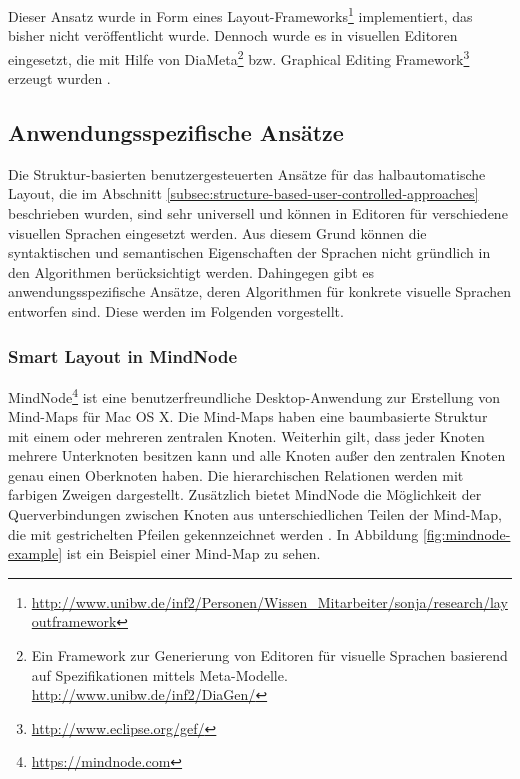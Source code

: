 



Dieser Ansatz wurde in Form eines Layout-Frameworks\footnote{\url{http://www.unibw.de/inf2/Personen/Wissen_Mitarbeiter/sonja/research/layoutframework}} implementiert, das bisher nicht veröffentlicht wurde. Dennoch wurde es in visuellen Editoren eingesetzt, die mit Hilfe von DiaMeta\footnote{Ein Framework zur Generierung von Editoren für visuelle Sprachen basierend auf Spezifikationen mittels Meta-Modelle. \url{http://www.unibw.de/inf2/DiaGen/}} bzw. Graphical Editing Framework\footnote{\url{http://www.eclipse.org/gef/}} erzeugt wurden \cite{Maier12A-Pattern-based}.

\subsection{Anwendungsspezifische Ansätze}

Die Struktur-basierten benutzergesteuerten Ansätze für das halbautomatische Layout, die im Abschnitt \ref{subsec:structure-based-user-controlled-approaches} beschrieben wurden, sind sehr universell und können in Editoren für verschiedene visuellen Sprachen eingesetzt werden. Aus diesem Grund können die syntaktischen und semantischen Eigenschaften der Sprachen nicht gründlich in den Algorithmen berücksichtigt werden. Dahingegen gibt es anwendungsspezifische Ansätze, deren Algorithmen für konkrete visuelle Sprachen entworfen sind. Diese werden im Folgenden vorgestellt.

\subsubsection{Smart Layout in MindNode}
\label{subsubsec:smart-layout-in-mindnode}

MindNode\footnote{\url{https://mindnode.com}} ist eine benutzerfreundliche Desktop-Anwendung zur Erstellung von Mind-Maps für Mac OS X. Die Mind-Maps haben eine baumbasierte Struktur mit einem oder mehreren zentralen Knoten. Weiterhin gilt, dass jeder Knoten mehrere Unterknoten besitzen kann und alle Knoten außer den zentralen Knoten genau einen Oberknoten haben. Die hierarchischen Relationen werden mit farbigen Zweigen dargestellt. Zusätzlich bietet MindNode die Möglichkeit der Querverbindungen zwischen Knoten aus unterschiedlichen Teilen der Mind-Map, die mit gestrichelten Pfeilen gekennzeichnet werden \cite{14MindNode}. In Abbildung \ref{fig:mindnode-example} ist ein Beispiel einer Mind-Map zu sehen.

